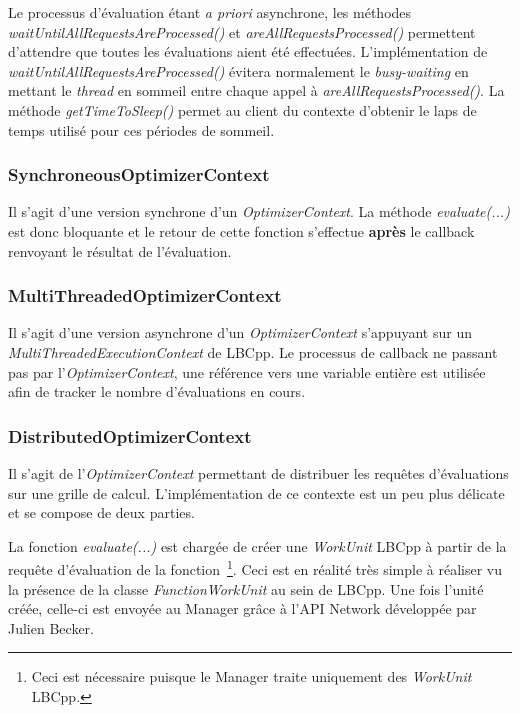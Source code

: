 \documentclass[a4paper, 11pt]{report}
\begin{document}
Le processus d'évaluation étant \textit{a priori} asynchrone, les méthodes \textit{waitUntilAllRequestsAreProcessed()} et \textit{areAllRequestsProcessed()} permettent d'attendre que toutes les évaluations aient été effectuées. L'implémentation de \textit{waitUntilAllRequestsAreProcessed()} évitera normalement le \textit{busy-waiting} en mettant le \textit{thread} en sommeil entre chaque appel à \textit{areAllRequestsProcessed()}. La méthode \textit{getTimeToSleep()} permet au client du contexte d'obtenir le laps de temps utilisé pour ces périodes de sommeil.

\subsubsection{SynchroneousOptimizerContext}
Il s'agit d'une version synchrone d'un \textit{OptimizerContext}. La méthode \textit{evaluate(...)} est donc bloquante et le retour de cette fonction s'effectue \textbf{après} le callback renvoyant le résultat de l'évaluation.

\subsubsection{MultiThreadedOptimizerContext}
Il s'agit d'une version asynchrone d'un \textit{OptimizerContext} s'appuyant sur un \textit{MultiThreadedExecutionContext} de LBCpp. Le processus de callback ne passant pas par l'\textit{OptimizerContext}, une référence vers une variable entière est utilisée afin de tracker le nombre d'évaluations en cours.

\subsubsection{DistributedOptimizerContext}
Il s'agit de l'\textit{OptimizerContext} permettant de distribuer les requêtes d'évaluations sur une grille de calcul. L'implémentation de ce contexte est un peu plus délicate et se compose de deux parties.

La fonction \textit{evaluate(...)} est chargée de créer une \textit{WorkUnit} LBCpp à partir de la requête d'évaluation de la fonction~\footnote{Ceci est nécessaire puisque le Manager traite uniquement des \textit{WorkUnit} LBCpp.}. Ceci est en réalité très simple à réaliser vu la présence de la classe \textit{FunctionWorkUnit} au sein de LBCpp. Une fois l'unité créée, celle-ci est envoyée au Manager grâce à l'API Network développée par Julien Becker.
\end{document}
